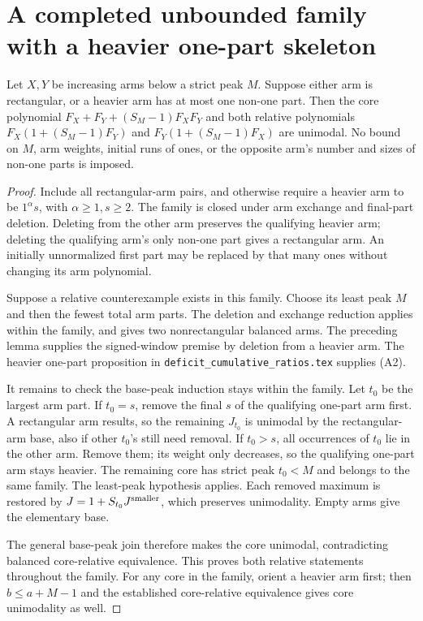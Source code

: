 \section{A completed unbounded family with a heavier one-part skeleton}
\begin{theorem}
Let $X,Y$ be increasing arms below a strict peak $M$.
Suppose either arm is rectangular, or a heavier arm has at
most one non-one part. Then the core polynomial
$F_X+F_Y+(S_M-1)F_XF_Y$ and both relative polynomials
$F_X(1+(S_M-1)F_Y)$ and $F_Y(1+(S_M-1)F_X)$ are unimodal.
No bound on $M$, arm weights, initial runs of ones, or the
opposite arm's number and sizes of non-one parts is imposed.
\end{theorem}
\begin{proof}
Include all rectangular-arm pairs, and otherwise require a
heavier arm to be $1^\alpha s$, with $\alpha\ge1,s\ge2$.
The family is closed under arm exchange and final-part deletion.
Deleting from the other arm preserves the qualifying heavier arm;
deleting the qualifying arm's only non-one part gives a rectangular
arm. An initially unnormalized first part may be replaced by that
many ones without changing its arm polynomial.

Suppose a relative counterexample exists in this family. Choose
its least peak $M$ and then the fewest total arm parts.
The deletion and exchange reduction applies within the family,
and gives two nonrectangular balanced arms. The preceding lemma
supplies the signed-window premise by deletion from a heavier arm.
The heavier one-part proposition in
\texttt{deficit\_cumulative\_ratios.tex} supplies (A2).

It remains to check the base-peak induction stays within the family.
Let $t_0$ be the largest arm part. If $t_0=s$, remove the final
$s$ of the qualifying one-part arm first. A rectangular arm results,
so the remaining $J_{t_0}$ is unimodal by the rectangular-arm
base, also if other $t_0$'s still need removal. If $t_0>s$, all
occurrences of $t_0$ lie in the other arm. Remove them; its weight
only decreases, so the qualifying one-part arm stays heavier.
The remaining core has strict peak $t_0<M$ and belongs to the
same family. The least-peak hypothesis applies. Each removed
maximum is restored by $J=1+S_{t_0}J^{\rm smaller}$, which
preserves unimodality. Empty arms give the elementary base.

The general base-peak join therefore makes the core unimodal,
contradicting balanced core-relative equivalence. This proves
both relative statements throughout the family. For any core
in the family, orient a heavier arm first; then
$b\le a+M-1$ and the established core-relative equivalence
gives core unimodality as well.
\end{proof}

